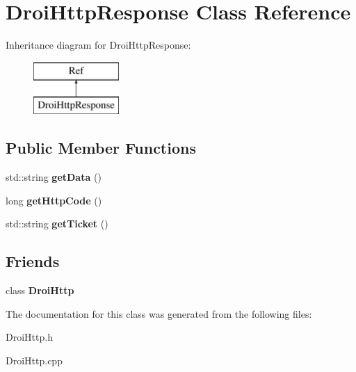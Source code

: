 \hypertarget{class_droi_http_response}{}\section{Droi\+Http\+Response Class Reference}
\label{class_droi_http_response}
Inheritance diagram for Droi\+Http\+Response\+:\begin{figure}[H]
\begin{center}
\leavevmode
\includegraphics[height=2.000000cm]{d9/d12/class_droi_http_response}
\end{center}
\end{figure}
\subsection*{Public Member Functions}
\begin{DoxyCompactItemize}
\item 
\mbox{\label{class_droi_http_response_a0671cf6344f59102f337492b5c8d2573}} 
std\+::string {\bfseries get\+Data} ()
\item 
\mbox{\label{class_droi_http_response_aa75d70517f2f0dd6471b2dbe2f052b6a}} 
long {\bfseries get\+Http\+Code} ()
\item 
\mbox{\label{class_droi_http_response_a9ba3177a5220745ca27f78904b015ba7}} 
std\+::string {\bfseries get\+Ticket} ()
\end{DoxyCompactItemize}
\subsection*{Friends}
\begin{DoxyCompactItemize}
\item 
\mbox{\label{class_droi_http_response_ad04cb70e678402e663c95435df2a194e}} 
class {\bfseries Droi\+Http}
\end{DoxyCompactItemize}


The documentation for this class was generated from the following files\+:\begin{DoxyCompactItemize}
\item 
Droi\+Http.\+h\item 
Droi\+Http.\+cpp\end{DoxyCompactItemize}
